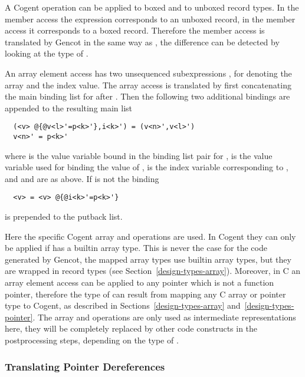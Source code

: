 A Cogent  operation can be applied to boxed and to unboxed record types. In the member access  the expression
 corresponds to an unboxed record, in the member access  it corresponds to a boxed record. Therefore the
member access  is translated by Gencot in the same way as , the difference can be detected by looking at
the type of .

An array element access  has two unsequenced subexpressions ,  for denoting the array and the index value.
The array access is translated by first concatenating the main binding list for  after . Then the following two additional 
bindings are appended to the resulting main list
\begin{verbatim}
  (<v> @{@v<l>'=p<k>'},i<k>') = (v<n>',v<l>')
  v<n>' = p<k>'
\end{verbatim}
where  is the value variable bound in the binding list pair for ,  is the value variable used for
binding the value of ,  is the index variable corresponding to , and  and  
are as above. If  is not \code{\_} the binding
\begin{verbatim}
  <v> = <v> @{@i<k>'=p<k>'}
\end{verbatim}
is prepended to the putback list.

Here the specific Cogent array  and  operations are used. In Cogent they can only be applied if 
has a builtin array type. This is never the case for the code generated by Gencot, the mapped array types use builtin array types,
but they are wrapped in record types (see Section~\ref{design-types-array}). Moreover, in C an array element access can be applied
to any pointer which is not a function pointer, therefore the type of  can result from mapping any C array or pointer
type to Cogent, as described in Sections~\ref{design-types-array} and~\ref{design-types-pointer}. The array  and 
operations are only used as intermediate representations here, they will be completely replaced by other code constructs in the
postprocessing steps, depending on the type of .

\subsubsection{Translating Pointer Dereferences}

